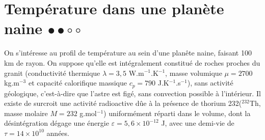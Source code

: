 \newpage	

\section{Température dans une planète naine $\bullet\bullet\circ\circ$}

On s'intéresse au profil de température au sein d'une planête naine, faisant 100 km de rayon. On suppose qu'elle est intégralement constitué de roches proches du granit (conductivité thermique $\lambda = 3,5$ W.m$^{-1}$.K$^{-1}$, masse volumique $\mu=2700$ kg.m$^{-3}$ et capacité calorifique massique $c_p=790$ J.K$^{-1}$.s$^{-1}$), sans activité géologique, c'est-à-dire que l'astre est figé, sans convection possible à l'intérieur. Il existe de surcroit une activité radioactive dûe à la présence de thorium 232($^{232}$Th, masse molaire $M=232$ g.mol$^{-1}$) uniformément réparti dans le volume, dont la désintégration dégage une énergie $\varepsilon=5,6\times10^{-12}$ J, avec une demi-vie de $\tau=14\times10^{10}$ années.

